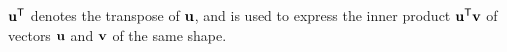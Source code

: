 \documentclass{article}
\newcommand\discard[1]{}
\begin{document}
$\mathbf{u}^{\sf T}$ denotes the transpose of $\mathbf{u}$, and is used to
express the inner product $\mathbf{u}^{\sf T} \mathbf{v}$ of vectors $\mathbf{u}$ and
$\mathbf{v}$ of the same shape.

%
\discard{
    \color{gray!30!white} If $\mat u = [u_a]_{a \in A}$ is a vector over $A$ and $\mat v = [v_b]_{b \in B}$ is a vector over $B$, then $\mat u \mathbin{\otimes} \mat v := [ u_a \cdot v_b ]_{a \in A, b \in B}$ is a vector over $A \times B$. }
\end{document}
